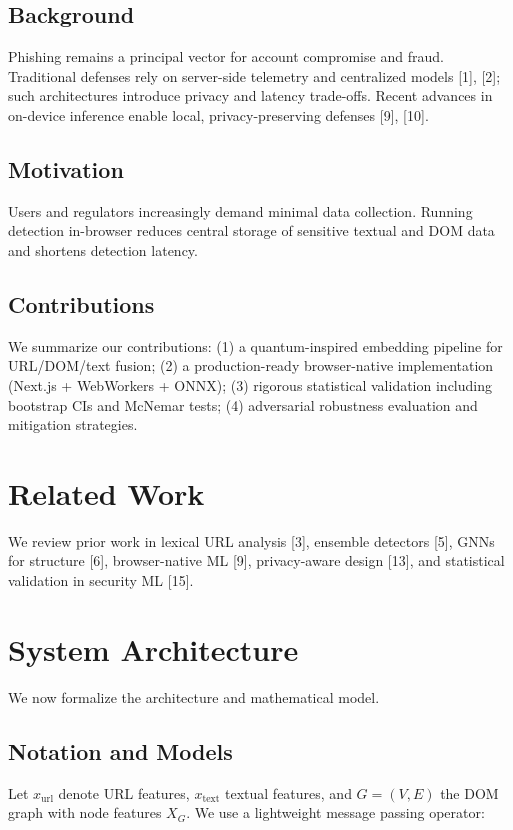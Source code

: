 \documentclass[conference]{IEEEtran}
\begin{document}
\subsection{Background}
Phishing remains a principal vector for account compromise and fraud. Traditional defenses rely on server-side telemetry and centralized models [1], [2]; such architectures introduce privacy and latency trade-offs. Recent advances in on-device inference enable local, privacy-preserving defenses [9], [10].

\subsection{Motivation}
Users and regulators increasingly demand minimal data collection. Running detection in-browser reduces central storage of sensitive textual and DOM data and shortens detection latency.

\subsection{Contributions}
We summarize our contributions: (1) a quantum-inspired embedding pipeline for URL/DOM/text fusion; (2) a production-ready browser-native implementation (Next.js + WebWorkers + ONNX); (3) rigorous statistical validation including bootstrap CIs and McNemar tests; (4) adversarial robustness evaluation and mitigation strategies.

\section{Related Work}
We review prior work in lexical URL analysis [3], ensemble detectors [5], GNNs for structure [6], browser-native ML [9], privacy-aware design [13], and statistical validation in security ML [15].

\section{System Architecture}
We now formalize the architecture and mathematical model.

\subsection{Notation and Models}
Let $x_{\text{url}}$ denote URL features, $x_{\text{text}}$ textual features, and $G=(V,E)$ the DOM graph with node features $X_G$. We use a lightweight message passing operator:
\end{document}

